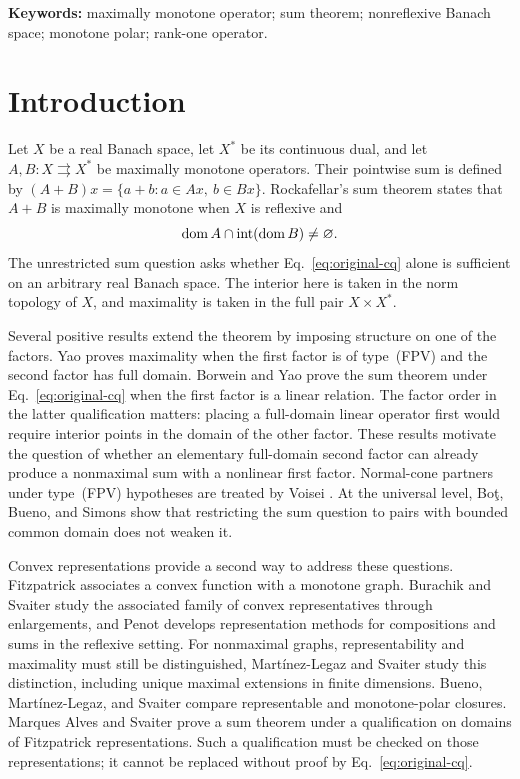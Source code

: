 \noindent\textbf{Keywords:} maximally monotone operator; sum theorem;
nonreflexive Banach space; monotone polar; rank-one operator.

\section{Introduction}
\label{sec:introduction}
Let $X$ be a real Banach space, let $X^*$ be its continuous dual, and let
$A,B:X\rightrightarrows X^*$ be maximally monotone operators. Their pointwise
sum is defined by $(A+B)x=\{a+b:a\in Ax,\ b\in Bx\}$. Rockafellar's sum
theorem \cite{rockafellar1970} states that $A+B$ is maximally monotone when
$X$ is reflexive and
\begin{equation}
\operatorname{dom} A\cap\operatorname{int}(\operatorname{dom} B)\ne\varnothing.
\label{eq:original-cq}
\end{equation}
The unrestricted sum question asks whether Eq.~\eqref{eq:original-cq}
alone is sufficient on an arbitrary real Banach space. The interior here
is taken in the norm topology of $X$, and maximality is taken in the full
pair $X\times X^*$. 

Several positive results extend the theorem by imposing structure on one
of the factors. Yao \cite{yao2010} proves maximality when the first factor
is of type~(FPV) and the second factor has full domain. Borwein and Yao
\cite{borweinyao2012} prove the sum theorem under
Eq.~\eqref{eq:original-cq} when the first factor is a linear relation.
The factor order in the latter qualification matters: placing a
full-domain linear operator first would require interior points in the
domain of the other factor. These results motivate the question of
whether an elementary full-domain second factor can already produce a
nonmaximal sum with a nonlinear first factor.
Normal-cone partners under type~(FPV) hypotheses are treated by Voisei
\cite{voisei2010}. At the universal level, Bo\c{t}, Bueno, and Simons
\cite{botbuenosimons2016} show that restricting the sum question to pairs
with bounded common domain does not weaken it. 

Convex representations provide a second way to address these questions.
Fitzpatrick \cite{fitzpatrick1988} associates a convex function with a
monotone graph. Burachik and Svaiter \cite{burachiksvaiter2002} study the
associated family of convex representatives through enlargements, and
Penot \cite{penot2004} develops representation methods for compositions
and sums in the reflexive setting. For nonmaximal graphs,
representability and maximality must still be distinguished, 
Mart\'{i}nez-Legaz and Svaiter \cite{martinezsvaiter2005} study this
distinction, including unique maximal extensions in finite dimensions.
Bueno, Mart\'{i}nez-Legaz,
and Svaiter \cite{buenomartinezsvaiter2014} compare representable and
monotone-polar closures. 
Marques Alves and Svaiter \cite{marquessvaiter2012} prove a sum theorem
under a qualification on domains of Fitzpatrick representations.
Such a qualification must be checked on those representations; it cannot
be replaced without proof by Eq.~\eqref{eq:original-cq}.

